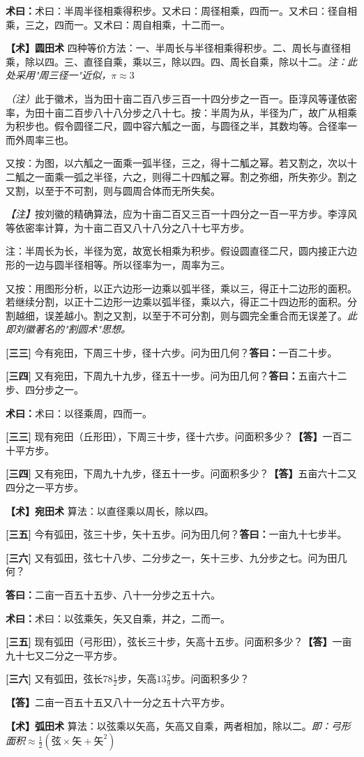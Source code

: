\documentclass[10pt,a4paper]{article}
\newlength{\lw}
\newlength{\rw}
\newcommand{\bilingc}[2]{%
  \par\vspace{0.1em}%
  \noindent\begin{minipage}[t]{\lw}
  {\small #1}
  \end{minipage}%
  \hfill%
  \begin{minipage}[t]{\rw}
  {\small #2}
  \end{minipage}%
  \vspace{0.1em}%
}
\newcommand{\da}{\textbf{\textcolor{answercolor}{答曰：}}}
\newcommand{\daB}{\textbf{\textcolor{answercolor}{【答】}}}
\newcommand{\shu}{\textbf{\textcolor{methodcolor}{术曰：}}}
\newcommand{\shuB}{\textbf{\textcolor{methodcolor}{【术】}}}
\newcommand{\zhu}{\textcolor{commentarycolor}{\small\textit{（注）}}}
\newcommand{\zhuB}{\textcolor{commentarycolor}{\small\textit{【注】}}}
\newcommand{\pn}[1]{\textbf{[#1]}}
\newcommand{\sk}{\vspace{0.1em}}
\begin{document}
\sk

\bilingc{
\shu 术曰：半周半径相乘得积步。又术曰：周径相乘，四而一。又术曰：径自相乘，三之，四而一。又术曰：周自相乘，十二而一。
}{
\shuB \textbf{圆田术} 四种等价方法：一、半周长与半径相乘得积步。二、周长与直径相乘，除以四。三、直径自乘，乘以三，除以四。四、周长自乘，除以十二。\textit{注：此处采用"周三径一"近似，$\pi\approx 3$}
}

\sk

\bilingc{
\zhu 此于徽术，当为田十亩二百八步三百一十四分步之一百一。臣淳风等谨依密率，为田十亩二百步八十八分步之八十七。按：半周为从，半径为广，故广从相乘为积步也。假令圆径二尺，圆中容六觚之一面，与圆径之半，其数均等。合径率一而外周率三也。

又按：为图，以六觚之一面乘一弧半径，三之，得十二觚之幂。若又割之，次以十二觚之一面乘一弧之半径，六之，则得二十四觚之幂。割之弥细，所失弥少。割之又割，以至于不可割，则与圆周合体而无所失矣。
}{
\zhuB 按刘徽的精确算法，应为十亩二百又三百一十四分之一百一平方步。李淳风等依密率计算，为十亩二百又八十八分之八十七平方步。

注：半周长为长，半径为宽，故宽长相乘为积步。假设圆直径二尺，圆内接正六边形的一边与圆半径相等。所以径率为一，周率为三。

又按：用图形分析，以正六边形一边乘以弧半径，乘以三，得正十二边形的面积。若继续分割，以正十二边形一边乘以弧半径，乘以六，得正二十四边形的面积。分割越细，误差越小。割之又割，以至于不可分割，则与圆完全重合而无误差了。\textit{此即刘徽著名的"割圆术"思想。}
}

\vspace{0.3em}

\bilingc{
\pn{三三} 今有宛田，下周三十步，径十六步。问为田几何？\quad\da 一百二十步。

\pn{三四} 又有宛田，下周九十九步，径五十一步。问为田几何？\quad\da 五亩六十二步、四分步之一。

\shu 术曰：以径乘周，四而一。
}{
\pn{三三} 现有宛田（丘形田），下周三十步，径十六步。问面积多少？\quad\daB 一百二十平方步。

\pn{三四} 又有宛田，下周九十九步，径五十一步。问面积多少？\quad\daB 五亩六十二又四分之一平方步。

\shuB \textbf{宛田术} 算法：以直径乘以周长，除以四。
}

\vspace{0.3em}

\bilingc{
\pn{三五} 今有弧田，弦三十步，矢十五步。问为田几何？\quad\da 一亩九十七步半。

\pn{三六} 又有弧田，弦七十八步、二分步之一，矢十三步、九分步之七。问为田几何？

\da 二亩一百五十五步、八十一分步之五十六。

\shu 术曰：以弦乘矢，矢又自乘，并之，二而一。
}{
\pn{三五} 现有弧田（弓形田），弦长三十步，矢高十五步。问面积多少？\quad\daB 一亩九十七又二分之一平方步。

\pn{三六} 又有弧田，弦长$78\frac{1}{2}$步，矢高$13\frac{7}{9}$步。问面积多少？

\daB 二亩一百五十五又八十一分之五十六平方步。

\shuB \textbf{弧田术} 算法：以弦乘以矢高，矢高又自乘，两者相加，除以二。\textit{即：弓形面积$\approx\frac12(\text{弦}\times\text{矢}+\text{矢}^2)$}
}
\end{document}
